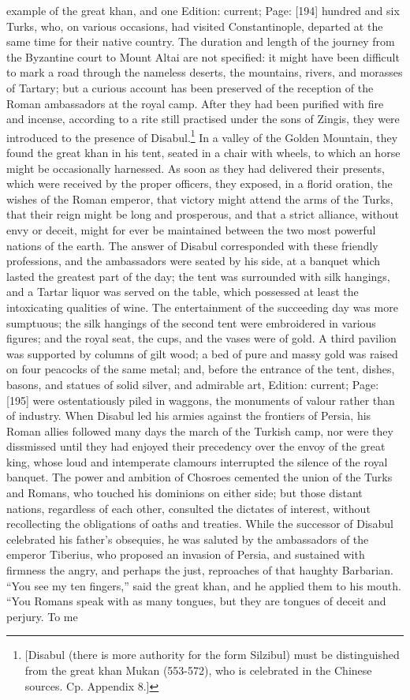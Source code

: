 example of the great khan, and one Edition: current; Page: [194] hundred and six Turks, who, on various occasions, had visited Constantinople, departed at the same time for their native country. The duration and length of the journey from the Byzantine court to Mount Altai are not specified: it might have been difficult to mark a road through the nameless deserts, the mountains, rivers, and morasses of Tartary; but a curious account has been preserved of the reception of the Roman ambassadors at the royal camp. After they had been purified with fire and incense, according to a rite still practised under the sons of Zingis, they were introduced to the presence of Disabul.\footnote{[Disabul (there is more authority for the form Silzibul) must be distinguished from the great khan Mukan (553-572), who is celebrated in the Chinese sources. Cp. Appendix 8.]} In a valley of the Golden Mountain, they found the great khan in his tent, seated in a chair with wheels, to which an horse might be occasionally harnessed. As soon as they had delivered their presents, which were received by the proper officers, they exposed, in a florid oration, the wishes of the Roman emperor, that victory might attend the arms of the Turks, that their reign might be long and prosperous, and that a strict alliance, without envy or deceit, might for ever be maintained between the two most powerful nations of the earth. The answer of Disabul corresponded with these friendly professions, and the ambassadors were seated by his side, at a banquet which lasted the greatest part of the day; the tent was surrounded with silk hangings, and a Tartar liquor was served on the table, which possessed at least the intoxicating qualities of wine. The entertainment of the succeeding day was more sumptuous; the silk hangings of the second tent were embroidered in various figures; and the royal seat, the cups, and the vases were of gold. A third pavilion was supported by columns of gilt wood; a bed of pure and massy gold was raised on four peacocks of the same metal; and, before the entrance of the tent, dishes, basons, and statues of solid silver, and admirable art, Edition: current; Page: [195] were ostentatiously piled in waggons, the monuments of valour rather than of industry. When Disabul led his armies against the frontiers of Persia, his Roman allies followed many days the march of the Turkish camp, nor were they dissmissed until they had enjoyed their precedency over the envoy of the great king, whose loud and intemperate clamours interrupted the silence of the royal banquet. The power and ambition of Chosroes cemented the union of the Turks and Romans, who touched his dominions on either side; but those distant nations, regardless of each other, consulted the dictates of interest, without recollecting the obligations of oaths and treaties. While the successor of Disabul celebrated his father\texthebrew{}’s obsequies, he was saluted by the ambassadors of the emperor Tiberius, who proposed an invasion of Persia, and sustained with firmness the angry, and perhaps the just, reproaches of that haughty Barbarian. \texthebrew{“}You see my ten fingers,\texthebrew{}” said the great khan, and he applied them to his mouth. \texthebrew{“}You Romans speak with as many tongues, but they are tongues of deceit and perjury. To me 